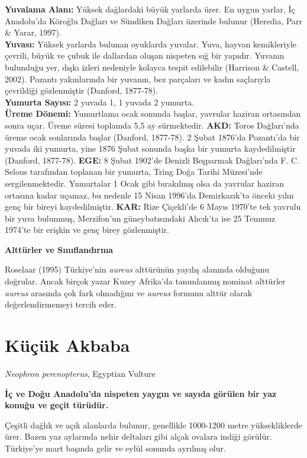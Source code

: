 \documentclass[
  a4paper,
  DIV=11,
  numbers=noendperiod]{scrreprt}
\begin{document}
\textbf{Yuvalama Alanı:} Yüksek dağlardaki büyük yarlarda ürer. En uygun
yarlar, İç Anadolu'da Köroğlu Dağları ve Sündiken Dağları üzerinde
bulunur (Heredia, Parr \& Yarar, 1997).\\
\textbf{Yuvası:} Yüksek yarlarda bulunan oyuklarda yuvalar. Yuva, hayvan
kemikleriyle çevrili, büyük ve çubuk ile dallardan oluşan nispeten sığ
bir yapıdır. Yuvanın bulunduğu yer, dışkı izleri nedeniyle kolayca
tespit edilebilir (Harrison \& Castell, 2002). Pozantı yakınlarında bir
yuvanın, bez parçaları ve kadın saçlarıyla çevrildiği gözlenmiştir
(Danford, 1877-78).\\
\textbf{Yumurta Sayısı:} 2 yuvada 1, 1 yuvada 2 yumurta.\\
\textbf{Üreme Dönemi:} Yumurtlama ocak sonunda başlar, yavrular haziran
ortasından sonra uçar. Üreme süresi toplamda 5,5 ay sürmektedir.
\textbf{AKD:} Toros Dağları'nda üreme ocak sonlarında başlar (Danford,
1877-78). 2 Şubat 1876'da Pozantı'da bir yuvada iki yumurta, yine 1876
Şubat sonunda başka bir yumurta kaydedilmiştir (Danford, 1877-78).
\textbf{EGE:} 8 Şubat 1902'de Denizli Beşparmak Dağları'nda F. C. Selous
tarafından toplanan bir yumurta, Tring Doğa Tarihi Müzesi'nde
sergilenmektedir. Yumurtalar 1 Ocak gibi bırakılmış olsa da yavrular
haziran ortasına kadar uçamaz, bu nedenle 15 Nisan 1996'da Demirkazık'ta
önceki yılın genç bir bireyi kaydedilmiştir. \textbf{KAR:} Rize
Çiçekli'de 6 Mayıs 1970'te tek yavrulu bir yuva bulunmuş, Merzifon'un
güneybatısındaki Alıcık'ta ise 25 Temmuz 1974'te bir erişkin ve genç
birey gözlenmiştir.

\textbf{Alttürler ve Sınıflandırma}

Roselaar (1995) Türkiye'nin \emph{aureus} alttürünün yayılış alanında
olduğunu doğrular. Ancak birçok yazar Kuzey Afrika'da tanımlanmış
nominat alttürler \emph{aureus} arasında çok fark olmadığını ve
\emph{aureus} formunu alttür olarak değerlendirmemeyi tercih eder.

\section{Küçük Akbaba}\label{kuxfcuxe7uxfck-akbaba}

\emph{Neophron percnopterus}, Egyptian Vulture

\textbf{İç ve Doğu Anadolu'da nispeten yaygın ve sayıda görülen bir yaz
konuğu ve geçit türüdür.}

Çeşitli dağlık ve açık alanlarda bulunur, genellikle 1000-1200 metre
yüksekliklerde ürer. Bazen yaz aylarında nehir deltaları gibi alçak
ovalara indiği görülür. Türkiye'ye mart başında gelir ve eylül sonunda
ayrılmış olur.
\end{document}

